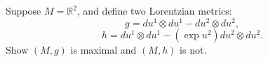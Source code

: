 Suppose $M = \mathbb{R}^2$, and define two Lorentzian metrics:
$$g = du^1 \otimes du^1 - du^2 \otimes du^2,$$
$$h = du^1 \otimes du^1 - (\exp u^2) du^2 \otimes du^2.$$
Show $(M, g)$ is maximal and $(M, h)$ is not.
